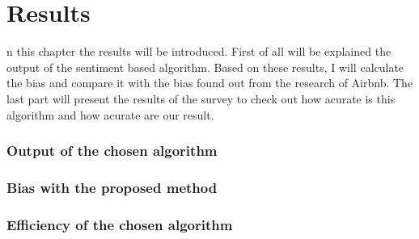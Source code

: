 %
%
\let\textcircled=\pgftextcircled
\chapter{Results}
\label{chap:results}

n this chapter the results will be introduced. First of all will be explained the output of the sentiment based algorithm. Based on these results, I will calculate the bias and compare it with the bias found out from the research of Airbnb. The last part will present the results of the survey to check out how acurate is this algorithm and how acurate are our result.
\subsection{Output of the chosen algorithm}
\subsection{Bias with the proposed method}
\subsection{Efficiency of the chosen algorithm}